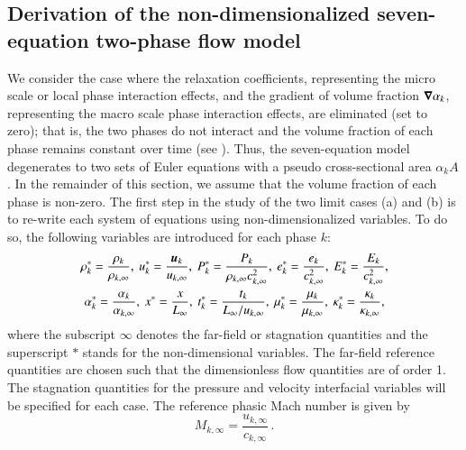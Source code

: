 \documentclass[preprint,10pt]{elsarticle}
\begin{document}
\subsection{Derivation of the non-dimensionalized seven-equation two-phase flow model}\label{sec:scaled-SEM}
We consider the case where the relaxation coefficients, representing the micro scale or local phase interaction effects, 
and the gradient of volume fraction $\boldsymbol\nabla \alpha_k$, representing the macro scale phase interaction effects, are eliminated (set to zero); that is, 
the two phases do not interact and the volume fraction of each phase remains constant over time (see ). 
Thus, the seven-equation model degenerates to two sets of Euler equations with a pseudo cross-sectional area $\alpha_k A$. In 
the remainder of this section, we assume that the volume fraction of each phase is non-zero.
%
The first step in the study of the two limit cases (a) and (b) is to re-write each system of equations using non-dimensionalized 
variables. To do so, the following variables are introduced for each phase $k$:
%
\begin{multline}
\label{eq:norm_param}
\rho_k^*   = \frac{\rho_k}{\rho_{k,\infty}}           ,\
u_k^*      = \frac{\boldsymbol u_k}{u_{k,\infty}}                 ,\
P_k^*      = \frac{P_k}{\rho_{k,\infty} c^2_{k,\infty}}   ,\
e_k^*      = \frac{e_k}{c^2_{k,\infty} }              , \
E_k^*      = \frac{E_k}{c^2_{k,\infty} }              , \\
\alpha_k^*      = \frac{\alpha_k}{\alpha_{k,\infty} }              , \
x^* = \frac{x}{L_\infty}                      ,\
t_k^* = \frac{t_k}{L_\infty / u_{k,\infty}}           ,\
\mu_k^*    = \frac{\mu_k}{\mu_{k,\infty}}             ,\
\kappa_k^* = \frac{\kappa_k}{\kappa_{k,\infty}}       ,
\end{multline}
%
where  the subscript $\infty$ denotes the far-field or stagnation quantities and the superscript $*$ stands for the non-dimensional variables.
The far-field reference quantities are chosen such that the dimensionless flow quantities are of order 1. The stagnation quantities for 
the pressure and velocity interfacial variables will be specified for each case. The reference phasic Mach number is given by
%
\begin{equation}
M_{k,\infty} = \frac{u_{k,\infty}}{c_{k,\infty}} \,.
\end{equation}
\end{document}
